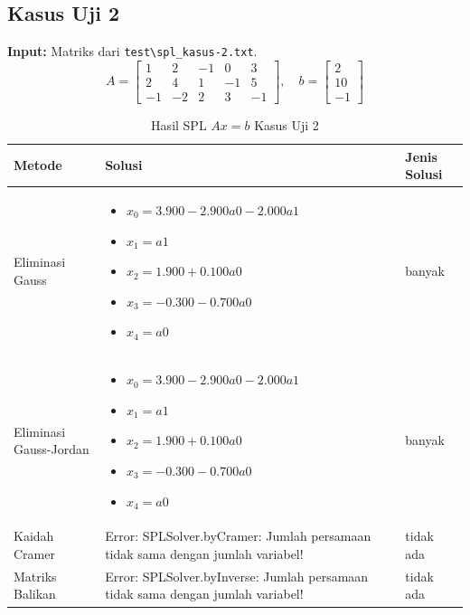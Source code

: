\documentclass[12pt,a4paper]{report}
\begin{document}
\subsection{Kasus Uji 2}
\textbf{Input:} Matriks dari \texttt{test\textbackslash spl\_kasus-2.txt}.
\[
A = \begin{bmatrix} 1 & 2 & -1 & 0 & 3 \\ 2 & 4 & 1 & -1 & 5 \\ -1 & -2 & 2 & 3 & -1\end{bmatrix},
\quad
b = \begin{bmatrix}  2 \\ 10 \\ -1\end{bmatrix}
\]
 
\begin{table}[H]
    \centering
    \caption{Hasil SPL $Ax=b$ Kasus Uji 2}
    \begin{tabular}{|l|p{5cm}|l|}
        \hline
        \textbf{Metode} & \textbf{Solusi} & \textbf{Jenis Solusi} \\
        \hline
        Eliminasi Gauss & 
        \begin{itemize}
            \item $x_0 = 3.900 - 2.900a0 - 2.000a1$
            \item $x_1 = a1$
            \item $x_2 = 1.900 + 0.100a0$
            \item $x_3 = -0.300 - 0.700a0$
            \item $x_4 = a0$
        \end{itemize}
        & banyak\\
        \hline
        Eliminasi Gauss-Jordan & 
        \begin{itemize}
            \item $x_0 = 3.900 - 2.900a0 - 2.000a1$
            \item $x_1 = a1$
            \item $x_2 = 1.900 + 0.100a0$
            \item $x_3 = -0.300 - 0.700a0$
            \item $x_4 = a0$
        \end{itemize}
        & banyak \\
        \hline
        Kaidah Cramer & 
        Error: SPLSolver.byCramer: Jumlah persamaan tidak sama dengan jumlah variabel!
        & tidak ada \\
        \hline
        Matriks Balikan & 
        Error: SPLSolver.byInverse: Jumlah persamaan tidak sama dengan jumlah variabel!
        & tidak ada\\
        \hline
    \end{tabular}
\end{table}
 
\end{document}
